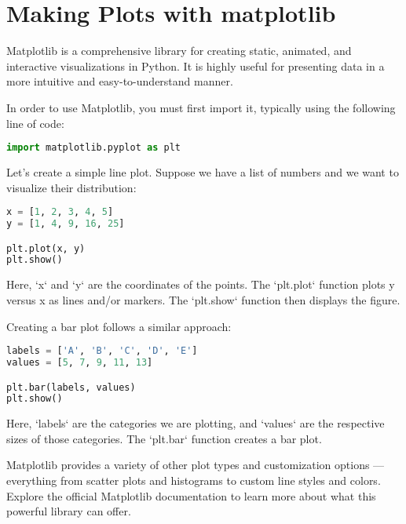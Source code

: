 \chapter{Making Plots with matplotlib}

Matplotlib is a comprehensive library for creating static, animated,
and interactive visualizations in Python. It is highly useful for
presenting data in a more intuitive and easy-to-understand manner.

In order to use Matplotlib, you must first import it, typically using
the following line of code:

\begin{lstlisting}[language=Python]
import matplotlib.pyplot as plt
\end{lstlisting}

Let's create a simple line plot. Suppose we have a list of numbers and
we want to visualize their distribution:

\begin{lstlisting}[language=Python]
x = [1, 2, 3, 4, 5]
y = [1, 4, 9, 16, 25]

plt.plot(x, y)
plt.show()
\end{lstlisting}

Here, `x` and `y` are the coordinates of the points. The `plt.plot`
function plots y versus x as lines and/or markers. The `plt.show`
function then displays the figure.

Creating a bar plot follows a similar approach:

\begin{lstlisting}[language=Python]
labels = ['A', 'B', 'C', 'D', 'E']
values = [5, 7, 9, 11, 13]

plt.bar(labels, values)
plt.show()
\end{lstlisting}

Here, `labels` are the categories we are plotting, and `values` are
the respective sizes of those categories. The `plt.bar` function
creates a bar plot.

Matplotlib provides a variety of other plot types and customization
options --- everything from scatter plots and histograms to custom line
styles and colors. Explore the official Matplotlib documentation to
learn more about what this powerful library can offer.
